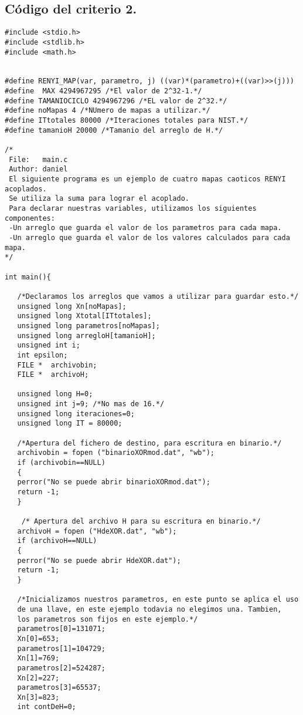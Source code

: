 \documentclass[12pt,3p]{elsarticle}
\begin{document}
\subsection{Código del criterio 2.}
\begin{verbatim}
#include <stdio.h>
#include <stdlib.h>
#include <math.h>


#define RENYI_MAP(var, parametro, j) ((var)*(parametro)+((var)>>(j)))
#define  MAX 4294967295 /*El valor de 2^32-1.*/
#define TAMANIOCICLO 4294967296 /*EL valor de 2^32.*/
#define noMapas 4 /*NUmero de mapas a utilizar.*/
#define ITtotales 80000 /*Iteraciones totales para NIST.*/
#define tamanioH 20000 /*Tamanio del arreglo de H.*/

/*
 File:   main.c
 Author: daniel
 El siguiente programa es un ejemplo de cuatro mapas caoticos RENYI acoplados.
 Se utiliza la suma para lograr el acoplado.
 Para declarar nuestras variables, utilizamos los siguientes componentes:
 -Un arreglo que guarda el valor de los parametros para cada mapa.
 -Un arreglo que guarda el valor de los valores calculados para cada mapa.
*/

int main(){
 
   /*Declaramos los arreglos que vamos a utilizar para guardar esto.*/
   unsigned long Xn[noMapas];
   unsigned long Xtotal[ITtotales]; 
   unsigned long parametros[noMapas];
   unsigned long arregloH[tamanioH];
   unsigned int i;
   int epsilon;
   FILE *  archivobin; 
   FILE *  archivoH;
  
   unsigned long H=0; 
   unsigned int j=9; /*No mas de 16.*/
   unsigned long iteraciones=0;
   unsigned long IT = 80000;

   /*Apertura del fichero de destino, para escritura en binario.*/
   archivobin = fopen ("binarioXORmod.dat", "wb");
   if (archivobin==NULL)
   {
   perror("No se puede abrir binarioXORmod.dat");
   return -1;
   }
   
    /* Apertura del archivo H para su escritura en binario.*/
   archivoH = fopen ("HdeXOR.dat", "wb");
   if (archivoH==NULL)
   {
   perror("No se puede abrir HdeXOR.dat");
   return -1;
   }
   
   /*Inicializamos nuestros parametros, en este punto se aplica el uso
   de una llave, en este ejemplo todavia no elegimos una. Tambien,
   los parametros son fijos en este ejemplo.*/
   parametros[0]=131071;
   Xn[0]=653;
   parametros[1]=104729;
   Xn[1]=769;
   parametros[2]=524287;
   Xn[2]=227;
   parametros[3]=65537;
   Xn[3]=823;
   int contDeH=0;
                   

\end{verbatim}
\end{document}
